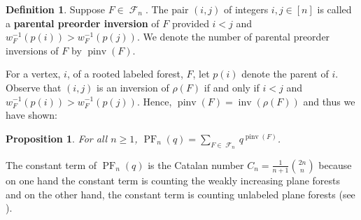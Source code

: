 \documentclass{amsart}
\newcommand{\seqnum}[1]{\href{http://oeis.org/#1}{\underline{#1}}}
\DeclareMathOperator{\inv}{inv}
\DeclareMathOperator{\PF}{PF}
\DeclareMathOperator{\pinv}{pinv}
\newcommand{\defterm}{\textbf}
\DeclareMathOperator{\F}{\mathcal{F}}
\newtheorem{proposition}[theorem]{Proposition}
\theoremstyle{definition}
\newtheorem{definition}[theorem]{Definition}
\begin{document}
    \begin{definition}
         Suppose $F\in \F_n$. The pair $(i,j)$ of integers $i,j\in [n]$ is called a \defterm{parental preorder inversion} of $F$ provided $i<j$ and $w_F^{-1}(p(i))>w_F^{-1}(p(j))$. We denote the number of parental preorder inversions of $F$ by $\pinv(F)$.
    \end{definition}


    For a vertex, $i$, of a rooted labeled forest, $F$, let $p(i)$ denote the parent of $i$. Observe that $(i,j)$ is an inversion of $\rho(F)$ if and only if $i<j$ and $w_F^{-1}(p(i))>w_F^{-1}(p(j))$. 
    Hence, $\pinv(F)=\inv(\rho(F))$ and thus we have shown:
   \begin{proposition}\label{prop:parental-preorder-inversion-gf}
   For all $n\geq 1$, 
    $    \PF_n(q)=\displaystyle\sum_{F\in \F_n}q^{\pinv(F)}$.
   \end{proposition}

The constant term of $\PF_n(q)$ is the Catalan number $C_n=\frac{1}{n+1}\binom{2n}{n}$ \cite[\seqnum{A000108}]{OEIS} because on one hand the constant term is counting the weakly increasing plane forests and on the other hand, the constant term is counting unlabeled plane forests (see \cite{stanley2015catalan}).
 
\end{document}
